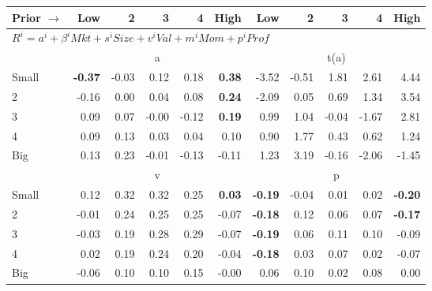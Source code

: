 
\begin{tabular}{lrrrrrrrrrr}
  \toprule
    
    Prior $\rightarrow$ & Low & 2 & 3 & 4 & High & Low & 2 & 3 & 4 & High  \\ 
  \midrule
  \multicolumn{11}{l}{$R^i=a^i+\beta^iMkt+s^iSize+v^iVal+m^iMom+p^iProf$}  \\
  
     & \multicolumn{5}{c}{a} & \multicolumn{5}{c}{t(a)}   \\
     \cmidrule(r){2-6} \cmidrule(r){7-11} 
    Small  & \textbf{-0.37}  & -0.03  & 0.12  & 0.18  & \textbf{0.38}  & -3.52  & -0.51  & 1.81  & 2.61  & 4.44   \\
    2  & -0.16  & 0.00  & 0.04  & 0.08  & \textbf{0.24}  & -2.09  & 0.05  & 0.69  & 1.34  & 3.54   \\
    3  & 0.09  & 0.07  & -0.00  & -0.12  & \textbf{0.19}  & 0.99  & 1.04  & -0.04  & -1.67  & 2.81   \\
    4  & 0.09  & 0.13  & 0.03  & 0.04  & 0.10  & 0.90  & 1.77  & 0.43  & 0.62  & 1.24   \\
    Big  & 0.13  & 0.23  & -0.01  & -0.13  & -0.11  & 1.23  & 3.19  & -0.16  & -2.06  & -1.45   \\
    
  
     & \multicolumn{5}{c}{v} & \multicolumn{5}{c}{p}   \\
     \cmidrule(r){2-6} \cmidrule(r){7-11} 
    Small  & 0.12  & 0.32  & 0.32  & 0.25  & \textbf{0.03}  & \textbf{-0.19}  & -0.04  & 0.01  & 0.02  & \textbf{-0.20}   \\
    2  & -0.01  & 0.24  & 0.25  & 0.25  & -0.07  & \textbf{-0.18}  & 0.12  & 0.06  & 0.07  & \textbf{-0.17}   \\
    3  & -0.03  & 0.19  & 0.28  & 0.29  & -0.07  & \textbf{-0.19}  & 0.06  & 0.11  & 0.10  & -0.09   \\
    4  & 0.02  & 0.19  & 0.24  & 0.20  & -0.04  & \textbf{-0.18}  & 0.03  & 0.07  & 0.02  & -0.07   \\
    Big  & -0.06  & 0.10  & 0.10  & 0.15  & -0.00  & 0.06  & 0.10  & 0.02  & 0.08  & 0.00   \\
    
  
    

\end{tabular}
